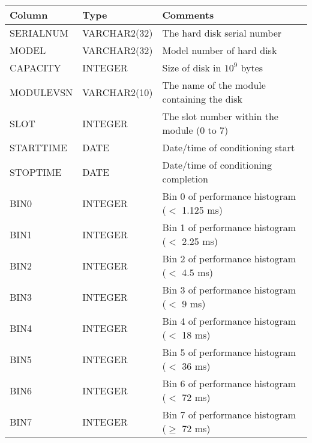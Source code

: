 \begin{center}
\begin{tabular}{lll}
\hline
\hline
   \multicolumn{1}{l}{Column}
 & \multicolumn{1}{l}{Type}
 & \multicolumn{1}{l}{Comments}
\\
\hline
SERIALNUM       & VARCHAR2(32)	& The hard disk serial number \\
MODEL           & VARCHAR2(32)  & Model number of hard disk \\
CAPACITY        & INTEGER       & Size of disk in $10^9$ bytes \\
MODULEVSN       & VARCHAR2(10)  & The name of the module containing the disk \\
SLOT            & INTEGER       & The slot number within the module (0 to 7) \\
STARTTIME       & DATE          & Date/time of conditioning start \\
STOPTIME        & DATE          & Date/time of conditioning completion \\
BIN0            & INTEGER       & Bin 0 of performance histogram ($<$ 1.125 ms) \\
BIN1            & INTEGER       & Bin 1 of performance histogram ($<$ 2.25 ms) \\
BIN2            & INTEGER       & Bin 2 of performance histogram ($<$ 4.5 ms) \\
BIN3            & INTEGER       & Bin 3 of performance histogram ($<$ 9 ms) \\
BIN4            & INTEGER       & Bin 4 of performance histogram ($<$ 18 ms) \\
BIN5            & INTEGER       & Bin 5 of performance histogram ($<$ 36 ms) \\
BIN6            & INTEGER       & Bin 6 of performance histogram ($<$ 72 ms) \\
BIN7            & INTEGER       & Bin 7 of performance histogram ($\ge$ 72 ms) \\
\hline
\end{tabular}
\end{center}
